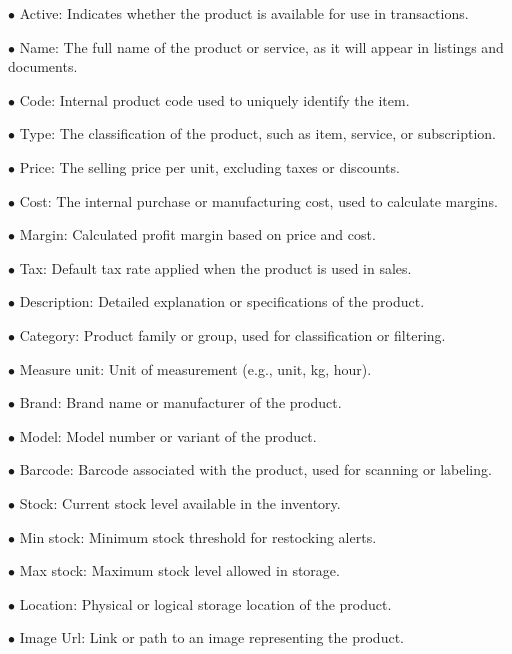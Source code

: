 \documentclass[a4paper]{article}
\begin{document}
\begin{compactitem}
\item[\color{myblue}$\bullet$] Active: Indicates whether the product is available for use in transactions.
\item[\color{myblue}$\bullet$] Name: The full name of the product or service, as it will appear in listings and documents.
\item[\color{myblue}$\bullet$] Code: Internal product code used to uniquely identify the item.
\item[\color{myblue}$\bullet$] Type: The classification of the product, such as item, service, or subscription.
\item[\color{myblue}$\bullet$] Price: The selling price per unit, excluding taxes or discounts.
\item[\color{myblue}$\bullet$] Cost: The internal purchase or manufacturing cost, used to calculate margins.
\item[\color{myblue}$\bullet$] Margin: Calculated profit margin based on price and cost.
\item[\color{myblue}$\bullet$] Tax: Default tax rate applied when the product is used in sales.
\item[\color{myblue}$\bullet$] Description: Detailed explanation or specifications of the product.
\item[\color{myblue}$\bullet$] Category: Product family or group, used for classification or filtering.
\item[\color{myblue}$\bullet$] Measure unit: Unit of measurement (e.g., unit, kg, hour).
\item[\color{myblue}$\bullet$] Brand: Brand name or manufacturer of the product.
\item[\color{myblue}$\bullet$] Model: Model number or variant of the product.
\item[\color{myblue}$\bullet$] Barcode: Barcode associated with the product, used for scanning or labeling.
\item[\color{myblue}$\bullet$] Stock: Current stock level available in the inventory.
\item[\color{myblue}$\bullet$] Min stock: Minimum stock threshold for restocking alerts.
\item[\color{myblue}$\bullet$] Max stock: Maximum stock level allowed in storage.
\item[\color{myblue}$\bullet$] Location: Physical or logical storage location of the product.
\item[\color{myblue}$\bullet$] Image Url: Link or path to an image representing the product.
\end{compactitem}
\end{document}
